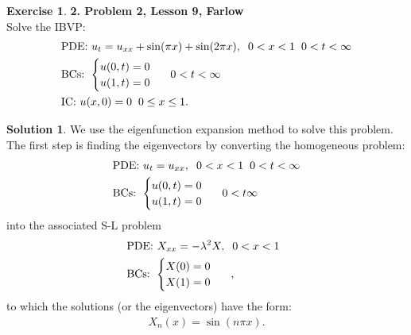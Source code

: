 \documentclass{book}
\theoremstyle{definition}
\newtheorem*{exer*}{Exercise}
\newtheorem*{sln*}{Solution}
\begin{document}
\begin{exer*}\textbf{2. Problem 2, Lesson 9, Farlow}\\
	Solve the IBVP:
	\begin{align*}
	&\text{PDE: } u_t = u_{xx} + \sin(\pi x) + \sin(2\pi x), \hspace{0.2cm} 0 < x < 1\hspace{0.2cm} 0 < t < \infty\\
	&\text{BCs: }\begin{cases}
	u(0,t) = 0\\
	u(1,t) = 0
	\end{cases}\hspace{0.2cm} 0 < t < \infty\\
	&\text{IC: }u(x,0) = 0\hspace{0.2cm}0\leq x\leq 1.
	\end{align*}
	
	\begin{sln*}
		We use the eigenfunction expansion method to solve this problem. The first step is finding the eigenvectors by converting the homogeneous problem:
		\begin{align*}
		&\text{PDE: } u_t = u_{xx}, \hspace{0.2cm} 0 < x < 1\hspace{0.2cm} 0 < t < \infty\\
		&\text{BCs: }\begin{cases}
		u(0,t) = 0\\
		u(1,t) = 0
		\end{cases}\hspace{0.2cm} 0 < t  \infty
		\end{align*}
		into the associated S-L problem 
		\begin{align*}
		&\text{PDE: } X_{xx} = -\lambda^2 X, \hspace{0.2cm} 0 < x < 1\hspace{0.2cm}\\
		&\text{BCs: }\begin{cases}
		X(0) = 0\\
		X(1) = 0
		\end{cases}\hspace{0.2cm},
		\end{align*}
		to which the solutions (or the eigenvectors) have the form:
		\begin{align*}
		X_n(x) = \sin(n\pi x).
		\end{align*}
		

\end{sln*}
\end{exer*}
\end{document}

